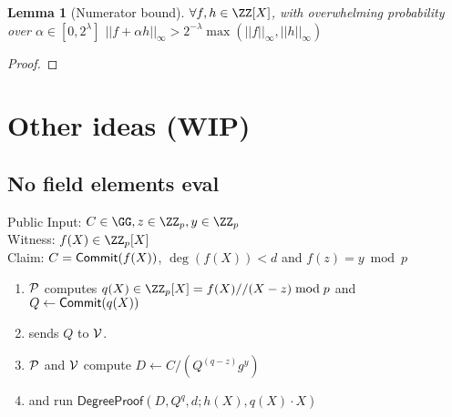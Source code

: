 \documentclass{article}
\theoremstyle{Definition}
\newtheorem{lemma}{Lemma}
\begin{document}
\begin{lemma}[Numerator bound]
$\forall f,h \in \ZZ[X]$, with overwhelming probability over $\alpha \in [0,2^\lambda]$ $||f+\alpha h||_\infty >2^{-\lambda} \max(||f||_\infty,||h||_\infty)$
	
\end{lemma}
\begin{proof}
	
\end{proof}


\section{Other ideas (WIP)}
\subsection{No field elements eval}


\begin{mdframed}
Public Input: $C\in \GG,z\in \ZZ_p,y\in \ZZ_p$\\
Witness: $f(X) \in \ZZ_p[X]$ \\
Claim: $C=\textsf{{Commit}}(f(X))$, $\deg(f(X))<d$ and $f(z)=y \bmod p$
	\begin{enumerate}[nolistsep]
		\item $\mathcal{P}$ computes $q(X) \in \ZZ_p[X]=f(X)//(X-z) \bmod p$ and $Q\gets\textsf{{Commit}}(q(X))$
		\item \prover sends $Q$ to $\mathcal{V}$.
		\item $\mathcal{P}$ and $\mathcal{V}$ compute $D\gets C/(Q^{(q-z)}g^y)$ 

		\item \prover and \verifier run $\textsf{DegreeProof}(D,Q^q,d;h(X),q(X)\cdot X)$
	\end{enumerate}
\end{mdframed}
\end{document}
